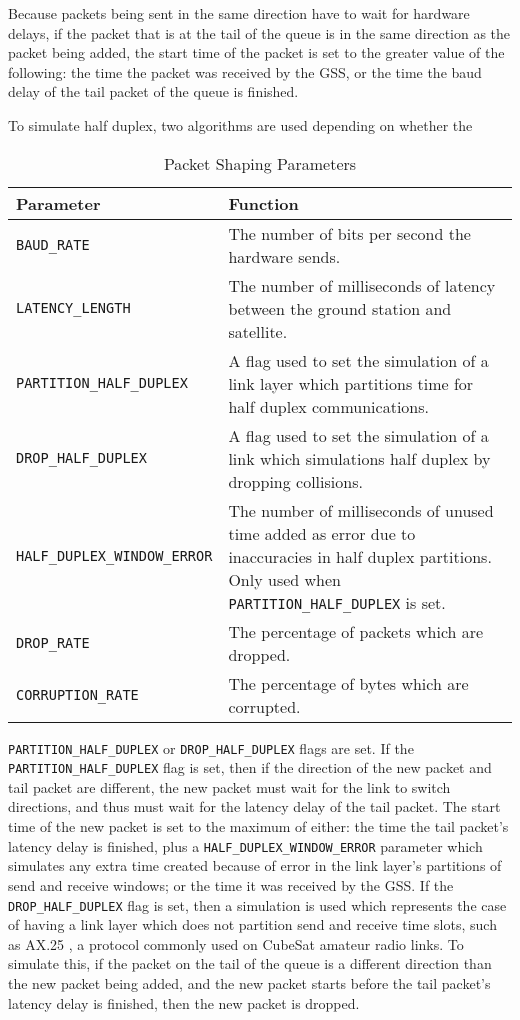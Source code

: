 \documentclass[journal]{./IEEEtran}
\begin{document}
Because packets being sent in the same direction have to wait for hardware delays, if the packet that is at the tail of the queue is in the same direction as the packet being added, the start time of the packet is set to the greater value of the following: the time the packet was received by the GSS, or the time the baud delay of the tail packet of the queue is finished.  

To simulate half duplex, two algorithms are used depending on whether the 
\begin{table*}[!ht]
\caption{Packet Shaping Parameters}
\label{table_shaping_parameters}
\begin{center}
\begin{tabular}{|l|p{13.0cm}|} \hline
\textbf{Parameter} & \textbf{Function} \\ \hline
{\tt BAUD\_RATE} & The number of bits per second the hardware sends. \\ \hline
{\tt LATENCY\_LENGTH}  & The number of milliseconds of latency between the ground station and satellite. \\ \hline
{\tt PARTITION\_HALF\_DUPLEX} & A flag used to set the simulation of a link layer which partitions time for half duplex communications. \\ \hline
{\tt DROP\_HALF\_DUPLEX}  & A flag used to set the simulation of a link which simulations half duplex by dropping collisions. \\ \hline
{\tt HALF\_DUPLEX\_WINDOW\_ERROR}  & The number of milliseconds of unused time added as error due to inaccuracies in half duplex partitions. Only used when {\tt PARTITION\_HALF\_DUPLEX} is set. \\ \hline
{\tt DROP\_RATE}  & The percentage of packets which are dropped. \\ \hline
{\tt CORRUPTION\_RATE}  & The percentage of bytes which are corrupted. \\ \hline
\end{tabular}
\end{center}
\end{table*}
{\tt PARTITION\_HALF\_DUPLEX} or {\tt DROP\_HALF\_DUPLEX} flags are set.  If the {\tt PARTITION\_HALF\_DUPLEX} flag is set, then if the direction of the new packet and tail packet are different, the new packet must wait for the link to switch directions, and thus must wait for the latency delay of the tail packet.  The start time of the new packet is set to the maximum of either: the time the tail packet’s latency delay is finished, plus a {\tt HALF\_DUPLEX\_WINDOW\_ERROR} parameter which simulates any extra time created because of error in the link layer’s partitions of send and receive windows; or the time it was received by the GSS.  If the {\tt DROP\_HALF\_DUPLEX} flag is set, then a simulation is used which represents the case of having a link layer which does not partition send and receive time slots, such as AX.25 \cite{ax.25}, a protocol commonly used on CubeSat amateur radio links.  To simulate this, if the packet on the tail of the queue is a different direction than the new packet being added, and the new packet starts before the tail packet’s latency delay is finished, then the new packet is dropped.
\end{document}
